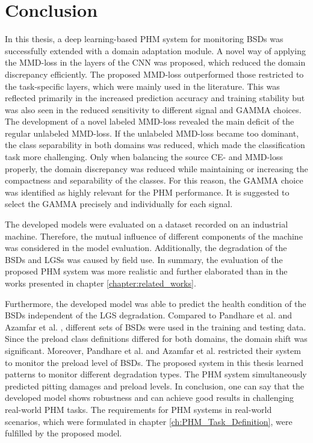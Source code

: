 \chapter{Conclusion}\label{chapter:conclusion}

In this thesis, a deep learning-based PHM system for monitoring BSDs was successfully extended with a domain adaptation module. A novel way of applying the MMD-loss in the layers of the CNN was proposed, which reduced the domain discrepancy efficiently. The proposed MMD-loss outperformed those restricted to the task-specific layers, which were mainly used in the literature. This was reflected primarily in the increased prediction accuracy and training stability but was also seen in the reduced sensitivity to different signal and GAMMA choices. The development of a novel labeled MMD-loss revealed the main deficit of the regular unlabeled MMD-loss. If the unlabeled MMD-loss became too dominant, the class separability in both domains was reduced, which made the classification task more challenging. Only when balancing the source CE- and MMD-loss properly, the domain discrepancy was reduced while maintaining or increasing the compactness and separability of the classes. For this reason, the GAMMA choice was identified as highly relevant for the PHM performance. It is suggested to select the GAMMA precisely and individually for each signal.

The developed models were evaluated on a dataset recorded on an industrial machine. Therefore, the mutual influence of different components of the machine was considered in the model evaluation. Additionally, the degradation of the BSDs and LGSs was caused by field use. In summary, the evaluation of the proposed PHM system was more realistic and further elaborated than in the works presented in chapter \ref{chapter:related_works}.

Furthermore, the developed model was able to predict the health condition of the BSDs independent of the LGS degradation. Compared to Pandhare et al. \cite{Pandhare2021} and Azamfar et al. \cite{AZAMFAR2020103932}, different sets of BSDs were used in the training and testing data. Since the preload class definitions differed for both domains, the domain shift was significant.
Moreover, Pandhare et al. \cite{Pandhare2021} and Azamfar et al. \cite{AZAMFAR2020103932} restricted their system to monitor the preload level of BSDs. The proposed system in this thesis learned patterns to monitor different degradation types. The PHM system simultaneously predicted pitting damages and preload levels. In conclusion, one can say that the developed model shows robustness and can achieve good results in challenging real-world PHM tasks. The requirements for PHM systems in real-world scenarios, which were formulated in chapter \ref{ch:PHM_Task_Definition}, were fulfilled by the proposed model.